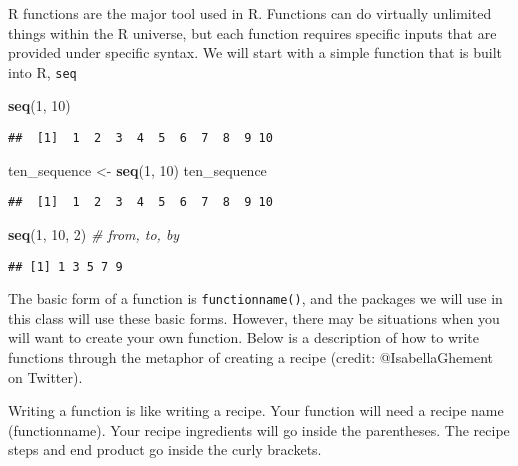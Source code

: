 \documentclass[
]{article}
\newenvironment{Shaded}{\begin{snugshade}}{\end{snugshade}}
\newcommand{\CommentTok}[1]{\textcolor[rgb]{0.56,0.35,0.01}{\textit{#1}}}
\newcommand{\DecValTok}[1]{\textcolor[rgb]{0.00,0.00,0.81}{#1}}
\newcommand{\KeywordTok}[1]{\textcolor[rgb]{0.13,0.29,0.53}{\textbf{#1}}}
\newcommand{\NormalTok}[1]{#1}
\newcommand{\StringTok}[1]{\textcolor[rgb]{0.31,0.60,0.02}{#1}}
\begin{document}
R functions are the major tool used in R. Functions can do virtually
unlimited things within the R universe, but each function requires
specific inputs that are provided under specific syntax. We will start
with a simple function that is built into R, \texttt{seq}

\begin{Shaded}
\begin{Highlighting}[]
\KeywordTok{seq}\NormalTok{(}\DecValTok{1}\NormalTok{, }\DecValTok{10}\NormalTok{)}
\end{Highlighting}
\end{Shaded}

\begin{verbatim}
##  [1]  1  2  3  4  5  6  7  8  9 10
\end{verbatim}

\begin{Shaded}
\begin{Highlighting}[]
\NormalTok{ten_sequence <-}\StringTok{ }\KeywordTok{seq}\NormalTok{(}\DecValTok{1}\NormalTok{, }\DecValTok{10}\NormalTok{)}
\NormalTok{ten_sequence}
\end{Highlighting}
\end{Shaded}

\begin{verbatim}
##  [1]  1  2  3  4  5  6  7  8  9 10
\end{verbatim}

\begin{Shaded}
\begin{Highlighting}[]
\KeywordTok{seq}\NormalTok{(}\DecValTok{1}\NormalTok{, }\DecValTok{10}\NormalTok{, }\DecValTok{2}\NormalTok{) }\CommentTok{# from, to, by}
\end{Highlighting}
\end{Shaded}

\begin{verbatim}
## [1] 1 3 5 7 9
\end{verbatim}

The basic form of a function is \texttt{functionname()}, and the
packages we will use in this class will use these basic forms. However,
there may be situations when you will want to create your own function.
Below is a description of how to write functions through the metaphor of
creating a recipe (credit: @IsabellaGhement on Twitter).

Writing a function is like writing a recipe. Your function will need a
recipe name (functionname). Your recipe ingredients will go inside the
parentheses. The recipe steps and end product go inside the curly
brackets.
\end{document}
